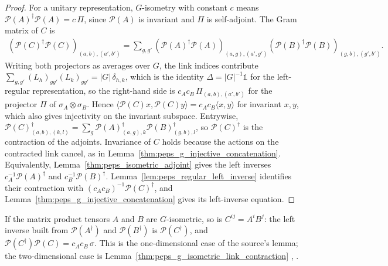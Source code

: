 \begin{proof}\leanok
    For a unitary representation, $G$-isometry with constant $c$ means
    $\mathcal{P}(A)^{\dagger}\mathcal{P}(A)=c\,\Pi$, since $\mathcal{P}(A)$ is
    invariant and $\Pi$ is self-adjoint. The Gram matrix of $C$ is
    \begin{align}
        (\mathcal{P}(C)^{\dagger}\mathcal{P}(C))_{(a,b),(a',b')}
        =\sum_{g,g'}(\mathcal{P}(A)^{\dagger}\mathcal{P}(A))_{(a,g),(a',g')}
        (\mathcal{P}(B)^{\dagger}\mathcal{P}(B))_{(g,b),(g',b')} .
        \label{eq:peps_link_contraction_gram}
    \end{align}
    Writing both projectors as averages over $G$, the link indices contribute
    $\sum_{g,g'}(L_{h})_{gg'}(L_{k})_{gg'}=|G|\,\delta_{h,k}$, which is the
    identity $\Delta=|G|^{-1}\mathbb{1}$ for the left-regular representation,
    so the right-hand side is $c_{A}c_{B}\,\Pi_{(a,b),(a',b')}$ for the
    projector $\Pi$ of $\sigma_{A}\otimes\sigma_{B}$. Hence
    $\langle\mathcal{P}(C)x,\mathcal{P}(C)y\rangle=c_{A}c_{B}\langle x,y\rangle$
    for invariant $x,y$, which also gives injectivity on the invariant
    subspace. Entrywise,
    $\mathcal{P}(C)^{\dagger}_{(a,b),(k,l)}
        =\sum_{g}\mathcal{P}(A)^{\dagger}_{(a,g),k}\mathcal{P}(B)^{\dagger}_{(g,b),l}$,
    so $\mathcal{P}(C)^{\dagger}$ is the contraction of the adjoints. Invariance of $C$ holds because the actions on the contracted
    link cancel, as in Lemma~\ref{thm:peps_g_injective_concatenation}.
    Equivalently, Lemma~\ref{thm:peps_isometric_adjoint} gives the
    left inverses $c_A^{-1}\mathcal P(A)^\dagger$ and
    $c_B^{-1}\mathcal P(B)^\dagger$.
    Lemma~\ref{lem:peps_regular_left_inverse} identifies their
    contraction with $(c_Ac_B)^{-1}\mathcal P(C)^\dagger$, and
    Lemma~\ref{thm:peps_g_injective_concatenation} gives its
    left-inverse equation.
\end{proof}

\begin{lemma}%
    \label{thm:peps_mps_g_isometric_concatenation}
    \leanok
    If the matrix product tensors $A$ and $B$ are $G$-isometric, so is
    $C^{ij}=A^iB^j$: the left inverse built from $\mathcal{P}(A^\dagger)$ and
    $\mathcal{P}(B^\dagger)$ is $\mathcal{P}(C^\dagger)$, and
    $\mathcal{P}(C^\dagger)\mathcal{P}(C)=c_Ac_B\,\sigma$. This is the
    one-dimensional case of the source's lemma; the two-dimensional case is
    Lemma~\ref{thm:peps_g_isometric_link_contraction}
    \cite[Lemma~6.2]{Schuch2010PEPS},
    \cite{gap:rmp_peps_quantum_double_g_isometry}.
\end{lemma}

